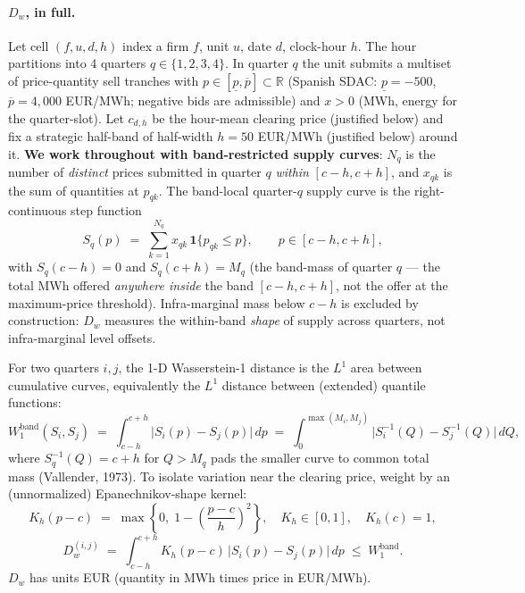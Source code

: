 \documentclass[11pt,a4paper]{article}
\begin{document}
\paragraph{$D_w$, in full.}
Let cell $(f, u, d, h)$ index a firm $f$, unit $u$, date $d$, clock-hour $h$. The hour partitions into 4 quarters $q \in \{1,2,3,4\}$. In quarter $q$ the unit submits a multiset of price-quantity sell tranches with $p\in[\underline p, \overline p] \subset \mathbb{R}$ (Spanish SDAC: $\underline p = -500$, $\overline p = 4{,}000$ EUR/MWh; negative bids are admissible) and $x>0$ (MWh, energy for the quarter-slot). Let $c_{d,h}$ be the hour-mean clearing price (justified below) and fix a strategic half-band of half-width $h = 50$ EUR/MWh (justified below) around it. \textbf{We work throughout with band-restricted supply curves}: $N_q$ is the number of \emph{distinct} prices submitted in quarter $q$ \emph{within} $[c-h, c+h]$, and $x_{qk}$ is the sum of quantities at $p_{qk}$. The band-local quarter-$q$ supply curve is the right-continuous step function
\[
  S_q(p) \;=\; \sum_{k=1}^{N_q} x_{qk}\,\mathbf{1}\{p_{qk}\le p\}, \qquad p \in [c-h, c+h],
\]
with $S_q(c-h) = 0$ and $S_q(c+h) = M_q$ (the band-mass of quarter $q$ --- the total MWh offered \emph{anywhere inside} the band $[c-h, c+h]$, not the offer at the maximum-price threshold). Infra-marginal mass below $c-h$ is excluded by construction: $D_w$ measures the within-band \emph{shape} of supply across quarters, not infra-marginal level offsets.

For two quarters $i, j$, the 1-D Wasserstein-1 distance is the $L^1$ area between cumulative curves, equivalently the $L^1$ distance between (extended) quantile functions:
\[
  W^{\text{band}}_1(S_i, S_j) \;=\; \int_{c-h}^{c+h}\!\big|S_i(p)-S_j(p)\big|\,dp \;=\; \int_{0}^{\max(M_i, M_j)}\!\big|S_i^{-1}(Q)-S_j^{-1}(Q)\big|\,dQ,
\]
where $S_q^{-1}(Q) = c+h$ for $Q > M_q$ pads the smaller curve to common total mass (Vallender, 1973). To isolate variation near the clearing price, weight by an (unnormalized) Epanechnikov-shape kernel:
\[
  K_h(p-c) \;=\; \max\!\left\{0,\;1 - \!\left(\frac{p-c}{h}\right)^{\!2}\right\}, \quad K_h \in [0,1], \quad K_h(c)=1,
\]
\[
  D^{(i,j)}_w \;=\; \int_{c-h}^{c+h}\! K_h(p-c)\,\big|S_i(p)-S_j(p)\big|\,dp \;\le\; W^{\text{band}}_1.
\]
$D_w$ has units EUR (quantity in MWh times price in EUR/MWh).
\end{document}
